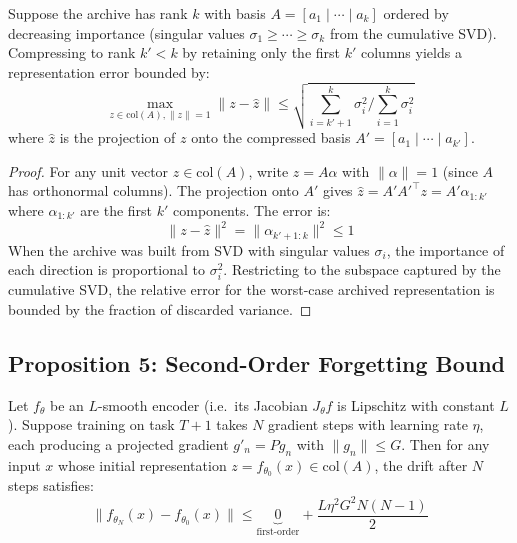 \begin{proposition}
\label{prop:compression}
Suppose the archive has rank $k$ with basis $A = [a_1 \mid \cdots \mid a_k]$
ordered by decreasing importance (singular values $\sigma_1 \geq \cdots
\geq \sigma_k$ from the cumulative SVD). Compressing to rank $k' < k$ by
retaining only the first $k'$ columns yields a representation error bounded by:
\begin{equation}
    \max_{z \in \mathrm{col}(A), \|z\|=1} \|z - \hat{z}\| \leq
    \sqrt{\sum_{i=k'+1}^{k} \sigma_i^2 \Big/ \sum_{i=1}^{k} \sigma_i^2}
\end{equation}
where $\hat{z}$ is the projection of $z$ onto the compressed basis
$A' = [a_1 \mid \cdots \mid a_{k'}]$.
\end{proposition}

\begin{proof}
For any unit vector $z \in \mathrm{col}(A)$, write $z = A\alpha$ with
$\|\alpha\| = 1$ (since $A$ has orthonormal columns). The projection onto
$A'$ gives $\hat{z} = A' A'^\top z = A' \alpha_{1:k'}$ where $\alpha_{1:k'}$
are the first $k'$ components. The error is:
\[
    \|z - \hat{z}\|^2 = \|\alpha_{k'+1:k}\|^2 \leq 1
\]
When the archive was built from SVD with singular values $\sigma_i$, the
importance of each direction is proportional to $\sigma_i^2$. Restricting
to the subspace captured by the cumulative SVD, the relative error for
the worst-case archived representation is bounded by the fraction of
discarded variance.
\end{proof}

\subsection{Proposition 5: Second-Order Forgetting Bound}

\begin{proposition}
\label{prop:second-order}
Let $f_\theta$ be an $L$-smooth encoder (i.e.\ its Jacobian $J_\theta f$
is Lipschitz with constant $L$). Suppose training on task $T+1$ takes
$N$ gradient steps with learning rate $\eta$, each producing a projected
gradient $g'_n = P g_n$ with $\|g_n\| \leq G$. Then for any input $x$
whose initial representation $z = f_{\theta_0}(x) \in \mathrm{col}(A)$,
the drift after $N$ steps satisfies:
\begin{equation}
    \|f_{\theta_N}(x) - f_{\theta_0}(x)\| \leq
    \underbrace{0}_{\text{first-order}} +
    \frac{L \eta^2 G^2 N(N-1)}{2}
    \label{eq:second-order-bound}
\end{equation}
\end{proposition}

